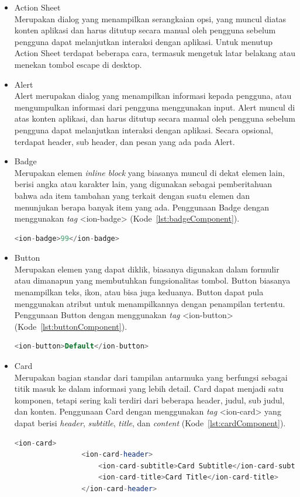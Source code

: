\begin{itemize}
	\item Action Sheet \\
	Merupakan dialog yang menampilkan serangkaian opsi, yang muncul diatas konten aplikasi dan harus ditutup secara manual oleh pengguna sebelum pengguna dapat melanjutkan interaksi dengan aplikasi. Untuk menutup Action Sheet terdapat beberapa cara, termasuk mengetuk latar belakang atau menekan tombol escape di desktop.

\newpage

	\item Alert \\
	Alert merupakan dialog yang menampilkan informasi kepada pengguna, atau mengumpulkan informasi dari pengguna menggunakan input. Alert muncul di atas konten aplikasi, dan harus ditutup secara manual oleh pengguna sebelum pengguna dapat melanjutkan interaksi dengan aplikasi. Secara opsional, terdapat header, sub header, dan pesan yang ada pada Alert.
	\item Badge \\
	Merupakan elemen {\it inline block} yang biasanya muncul di dekat elemen lain, berisi angka atau karakter lain, yang digunakan sebagai pemberitahuan bahwa ada item tambahan yang terkait dengan suatu elemen dan menunjukan berapa banyak item yang ada. Penggunaan Badge dengan menggunakan {\it tag} <ion-badge> (Kode~\ref{lst:badgeComponent}).
	\begin{lstlisting}[language=php, label={lst:badgeComponent}, caption=Potongan Kode Program dari Badge Component]
			<ion-badge>99</ion-badge>
	\end{lstlisting} 
	\item Button \\
	Merupakan elemen yang dapat diklik, biasanya digunakan dalam formulir atau dimanapun yang membutuhkan fungsionalitas tombol. Button biasanya menampilkan teks, ikon, atau bisa juga keduanya. Button dapat pula menggunakan atribut untuk menampilkannya dengan penampilan tertentu. Penggunaan Button dengan menggunakan {\it tag} <ion-button>  (Kode~\ref{lst:buttonComponent}).
	\begin{lstlisting}[language=php, label={lst:buttonComponent}, caption=Potongan Kode Program dari Button Component]
			<ion-button>Default</ion-button>
	\end{lstlisting} 
	\item Card \\
	Merupakan bagian standar dari tampilan antarmuka yang berfungsi sebagai titik masuk ke dalam informasi yang lebih detail. Card dapat menjadi satu komponen, tetapi sering kali terdiri dari beberapa header, judul, sub judul, dan konten. Penggunaan Card dengan menggunakan {\it tag} <ion-card> yang dapat berisi {\it header}, {\it subtitle}, {\it title}, dan {\it content} (Kode~\ref{lst:cardComponent}).
	\begin{lstlisting}[language=php, label={lst:cardComponent}, caption=Potongan Kode Program dari Card Component]
			<ion-card>
				<ion-card-header>
					<ion-card-subtitle>Card Subtitle</ion-card-subtitle>
					<ion-card-title>Card Title</ion-card-title>
				</ion-card-header>
				

\end{lstlisting}
\end{itemize}
